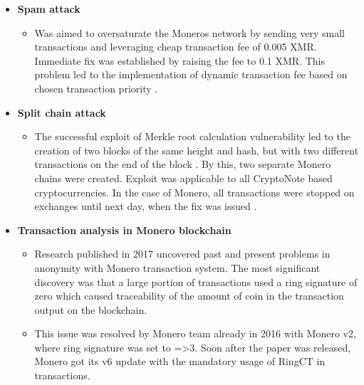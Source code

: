 \documentclass[
  printed, %
  table,   %
  nolof,     %
  nolot,     %
           oneside, color
]{fithesis3}
\begin{document}
\begin{itemize}
\item \textbf{Spam attack}
\begin{itemize}
\item Was aimed to oversaturate the Moneros network by sending very small transactions and leveraging cheap transaction fee of 0.005 XMR. Immediate fix was established by raising the fee to 0.1 XMR. This problem led to the implementation of dynamic transaction fee based on chosen transaction priority  \cite{monerospamattack}.
\end{itemize}
\item \textbf{Split chain attack}
\begin{itemize}
\item The successful exploit of Merkle root calculation vulnerability led to the creation of two blocks of the same height and hash, but with two different transactions on the end of the block \cite{macheta2014counterfeiting}. By this, two separate Monero chains were created. Exploit was applicable to all CryptoNote based cryptocurrencies. In the case of Monero, all transactions were stopped on exchanges until next day, when the fix was issued \cite{cryptonotemerkletree}.
\end{itemize}
\item \textbf{Transaction analysis in Monero blockchain}
\begin{itemize}
\item Research published in 2017 uncovered past and present problems in anonymity with Monero transaction system. The most significant discovery was that a large portion of transactions used a ring signature of zero which caused traceability of the amount of coin in the transaction output on the blockchain.
\item This issue was resolved by Monero team already in 2016 with Monero v2, where ring signature was set to =>3. Soon after the paper was released, Monero got its v6 update with the mandatory usage of RingCT in transactions.
\end{itemize}
\end{itemize}
\newpage
\end{document}
